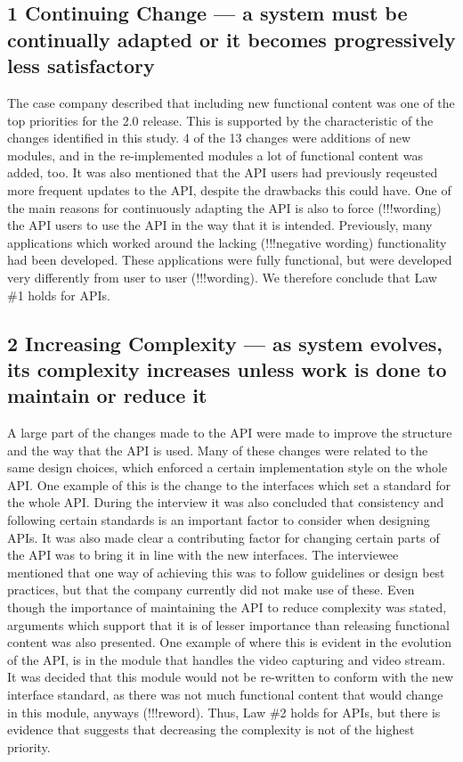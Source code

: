 \documentclass[conference]{IEEEtran}
\begin{document}
\subsection{1 Continuing Change — a system must be continually adapted or it becomes progressively less satisfactory}
The case company described that including new functional content was one of the top priorities for the 2.0 release. This is supported by the characteristic of the changes identified in this study. 4 of the 13 changes were additions of new modules, and in the re-implemented modules a lot of functional content was added, too. It was also mentioned that the API users had previously reqeusted more frequent updates to the API, despite the drawbacks this could have. One of the main reasons for continuously adapting the API is also to force (!!!wording) the API users to use the API in the way that it is intended. Previously, many applications which worked around the lacking (!!!negative wording) functionality had been developed. These applications were fully functional, but were developed very differently from user to user (!!!wording). We therefore conclude that Law \#1 holds for APIs. 

\subsection{2 Increasing Complexity — as system evolves, its complexity increases unless work is done to maintain or reduce it}
A large part of the changes made to the API were made to improve the structure and the way that the API is used. Many of these changes were related to the same design choices, which enforced a certain implementation style on the whole API. One example of this is the change to the interfaces which set a standard for the whole API. During the interview it was also concluded that consistency and following certain standards is an important factor to consider when designing APIs. It was also made clear a contributing factor for changing certain parts of the API was to bring it in line with the new interfaces. The interviewee mentioned that one way of achieving this was to follow guidelines or design best practices, but that the company currently did not make use of these. Even though the importance of maintaining the API to reduce complexity was stated, arguments which support that it is of lesser importance than releasing functional content was also presented. One example of where this is evident in the evolution of the API, is in the module that handles the video capturing and video stream. It was decided that this module would not be re-written to conform with the new interface standard, as there was not much functional content that would change in this module, anyways (!!!reword). Thus, Law \#2 holds for APIs, but there is evidence that suggests that decreasing the complexity is not of the highest priority. 
\end{document}
